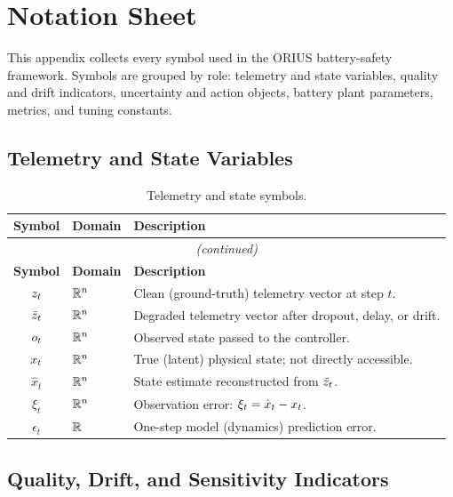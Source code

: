 \chapter{Notation Sheet}
\label{app:notation}

This appendix collects every symbol used in the ORIUS battery-safety
framework.  Symbols are grouped by role: telemetry and state variables,
quality and drift indicators, uncertainty and action objects, battery
plant parameters, metrics, and tuning constants.

\section{Telemetry and State Variables}

\begin{longtable}{@{}clp{8.2cm}@{}}
\caption{Telemetry and state symbols.}\label{tab:notation-state}\\
\toprule
\textbf{Symbol} & \textbf{Domain} & \textbf{Description} \\
\midrule
\endfirsthead
\multicolumn{3}{c}{\emph{(continued)}}\\
\toprule
\textbf{Symbol} & \textbf{Domain} & \textbf{Description} \\
\midrule
\endhead
\bottomrule
\endfoot
$z_t$         & $\mathbb{R}^n$     & Clean (ground-truth) telemetry vector at step $t$. \\
$\tilde{z}_t$        & $\mathbb{R}^n$     & Degraded telemetry vector after dropout, delay, or drift. \\
$o_t$         & $\mathbb{R}^n$     & Observed state passed to the controller. \\
$x_t$         & $\mathbb{R}^n$     & True (latent) physical state; not directly accessible. \\
$\hat{x}_t$   & $\mathbb{R}^n$     & State estimate reconstructed from $\tilde{z}_t$. \\
$\xi_t$       & $\mathbb{R}^n$     & Observation error: $\xi_t = \hat{x}_t - x_t$. \\
$\epsilon_t$  & $\mathbb{R}$       & One-step model (dynamics) prediction error. \\
\end{longtable}

\section{Quality, Drift, and Sensitivity Indicators}

